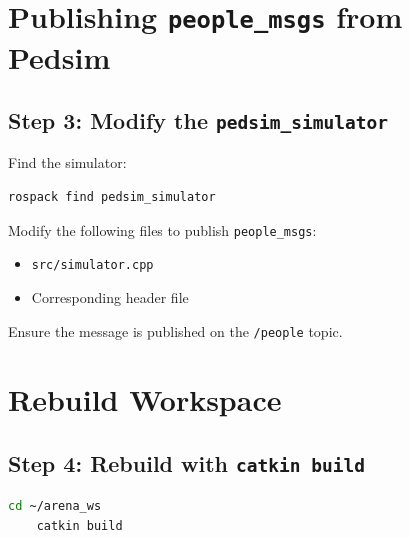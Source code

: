 \section{Publishing \texttt{people\_msgs} from Pedsim}
\subsection*{Step 3: Modify the \texttt{pedsim\_simulator}}

Find the simulator:

\begin{lstlisting}[language=bash]
    rospack find pedsim_simulator
\end{lstlisting}

Modify the following files to publish \texttt{people\_msgs}:
\begin{itemize}
  \item \texttt{src/simulator.cpp}
  \item Corresponding header file
\end{itemize}

Ensure the message is published on the \texttt{/people} topic.



\section{Rebuild Workspace}
\subsection*{Step 4: Rebuild with \texttt{catkin build}}

\begin{lstlisting}[language=bash]
    cd ~/arena_ws
    catkin build
\end{lstlisting}











